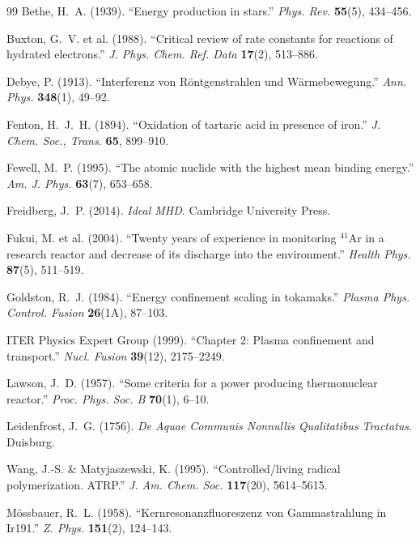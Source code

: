 \vspace{2em}
\begin{thebibliography}{99}
Bethe, H.~A. (1939).
``Energy production in stars.''
\textit{Phys. Rev.} \textbf{55}(5), 434--456.

Buxton, G.~V. et al. (1988).
``Critical review of rate constants for reactions of hydrated electrons.''
\textit{J. Phys. Chem. Ref. Data} \textbf{17}(2), 513--886.

Debye, P. (1913).
``Interferenz von R\"ontgenstrahlen und W\"armebewegung.''
\textit{Ann. Phys.} \textbf{348}(1), 49--92.

Fenton, H.~J.~H. (1894).
``Oxidation of tartaric acid in presence of iron.''
\textit{J. Chem. Soc., Trans.} \textbf{65}, 899--910.

Fewell, M.~P. (1995).
``The atomic nuclide with the highest mean binding energy.''
\textit{Am. J. Phys.} \textbf{63}(7), 653--658.

Freidberg, J.~P. (2014).
\textit{Ideal MHD}. Cambridge University Press.

Fukui, M. et al. (2004).
``Twenty years of experience in monitoring ${}^{41}$Ar in a research reactor and decrease of its discharge into the environment.''
\textit{Health Phys.} \textbf{87}(5), 511--519.

Goldston, R.~J. (1984).
``Energy confinement scaling in tokamaks.''
\textit{Plasma Phys. Control. Fusion} \textbf{26}(1A), 87--103.

ITER Physics Expert Group (1999).
``Chapter 2: Plasma confinement and transport.''
\textit{Nucl. Fusion} \textbf{39}(12), 2175--2249.

Lawson, J.~D. (1957).
``Some criteria for a power producing thermonuclear reactor.''
\textit{Proc. Phys. Soc. B} \textbf{70}(1), 6--10.

Leidenfrost, J.~G. (1756).
\textit{De Aquae Communis Nonnullis Qualitatibus Tractatus}. Duisburg.

Wang, J.-S. \& Matyjaszewski, K. (1995).
``Controlled/living radical polymerization. ATRP.''
\textit{J. Am. Chem. Soc.} \textbf{117}(20), 5614--5615.

M\"ossbauer, R.~L. (1958).
``Kernresonanzfluoreszenz von Gammastrahlung in Ir191.''
\textit{Z. Phys.} \textbf{151}(2), 124--143.


\end{thebibliography}
